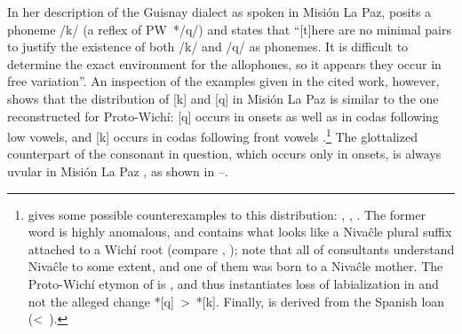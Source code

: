 In her description of the Guisnay dialect as spoken in Misión La Paz, \citet[43--44]{MA08} posits a phoneme /k/ (a reflex of PW~*/q/) and states that ``[t]here are no minimal pairs to justify the existence of both /k/ and /q/ as phonemes. It is difficult to determine the exact environment for the allophones, so it appears they occur in free variation''. An inspection of the examples given in the cited work, however, shows that the distribution of [k] and [q] in Misión La Paz is similar to the one reconstructed for Proto-Wichí: [q] occurs in onsets as well as in codas following low vowels, and [k] occurs in codas following front vowels .\footnote{\citet[43, 82]{MA08} gives some possible counterexamples to this distribution: , , . The former word is highly anomalous, and contains what looks like a Nivaĉle plural suffix attached to a Wichí root (compare , ); note that all of  consultants understand Nivaĉle to some extent, and one of them was born to a Nivaĉle mother. The Proto-Wichí etymon of  is , and thus instantiates loss of labialization in  and not the alleged change *[q]~>~*[k]. Finally,  is derived from the Spanish loan  (<~).} The glottalized counterpart of the consonant in question, which occurs only in onsets, is always uvular in Misión La Paz \citep[44]{MA08}, as shown in –.

